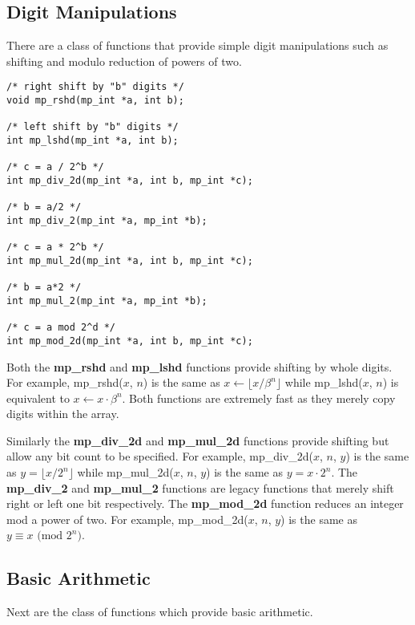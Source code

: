 \documentclass{article}
\begin{document}
\subsection{Digit Manipulations}

There are a class of functions that provide simple digit manipulations such as shifting and modulo reduction of powers
of two.  

\begin{verbatim}
/* right shift by "b" digits */
void mp_rshd(mp_int *a, int b);

/* left shift by "b" digits */
int mp_lshd(mp_int *a, int b);

/* c = a / 2^b */
int mp_div_2d(mp_int *a, int b, mp_int *c);

/* b = a/2 */
int mp_div_2(mp_int *a, mp_int *b);

/* c = a * 2^b */
int mp_mul_2d(mp_int *a, int b, mp_int *c);

/* b = a*2 */
int mp_mul_2(mp_int *a, mp_int *b);

/* c = a mod 2^d */
int mp_mod_2d(mp_int *a, int b, mp_int *c);
\end{verbatim}

Both the \textbf{mp\_rshd} and \textbf{mp\_lshd} functions provide shifting by whole digits.  For example, 
mp\_rshd($x$, $n$) is the same as $x \leftarrow \lfloor x / \beta^n \rfloor$ while mp\_lshd($x$, $n$) is equivalent
to $x \leftarrow x \cdot \beta^n$.  Both functions are extremely fast as they merely copy digits within the array.  

Similarly the \textbf{mp\_div\_2d} and \textbf{mp\_mul\_2d} functions provide shifting but allow any bit count to 
be specified.  For example, mp\_div\_2d($x$, $n$, $y$) is the same as $y =\lfloor x / 2^n \rfloor$ while 
mp\_mul\_2d($x$, $n$, $y$) is the same as $y = x \cdot 2^n$.  The \textbf{mp\_div\_2} and \textbf{mp\_mul\_2} 
functions are legacy functions that merely shift right or left one bit respectively.  The \textbf{mp\_mod\_2d} function
reduces an integer mod a power of two.  For example, mp\_mod\_2d($x$, $n$, $y$) is the same as 
$y \equiv x \mbox{ (mod }2^n\mbox{)}$.

\subsection{Basic Arithmetic}

Next are the class of functions which provide basic arithmetic.
\end{document}
